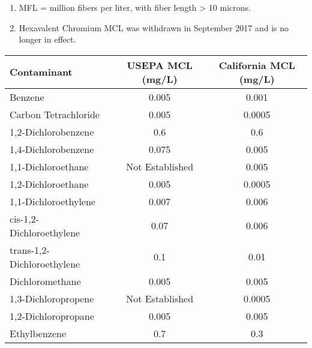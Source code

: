 \documentclass{article}
\begin{document}
\small{\begin{enumerate}
\item MFL = million fibers per liter, with fiber length > 10 microns.
\item Hexavalent Chromium MCL was withdrawn in September 2017 and is no longer in effect.
\end{enumerate}}


\begin{table}[ht]
\begin{center}
\begin{tabular}{|l|c|c|}
\hline
Contaminant  & USEPA   MCL  (mg/L) & California   MCL  (mg/L) \\
\hline
Benzene                                                                    & 0.005  & 0.001  \\ \hline
Carbon   Tetrachloride                                                     & 0.005 & 0.0005\\ \hline
1,2-Dichlorobenzene                                                        & 0.6    & 0.6  \\ \hline
1,4-Dichlorobenzene                                                        & 0.075  & 0.005 \\ \hline
1,1-Dichloroethane                                                         & Not   Established & 0.005   \\ \hline
1,2-Dichloroethane                                                         & 0.005                                                                                                   & 0.0005  \\ \hline
1,1-Dichloroethylene                                                       & 0.007   & 0.006 \\ \hline
cis-1,2-   Dichloroethylene                                                & 0.07  & 0.006   \\ \hline
trans-1,2-   Dichloroethylene                                              & 0.1    & 0.01 \\ \hline
Dichloromethane                                                            & 0.005    & 0.005 \\ \hline
1,3-Dichloropropene                                                        & Not   Established  & 0.0005 \\ \hline
1,2-Dichloropropane                                                        & 0.005  & 0.005   \\ \hline
Ethylbenzene                                                               & 0.7  & 0.3     \\ \hline

\end{tabular}
\end{center}
\end{table}
\end{document}
